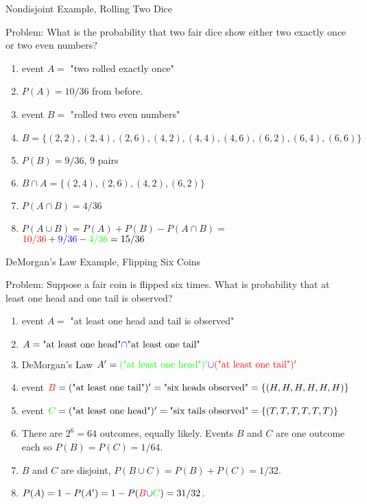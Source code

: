 \documentclass{beamer}
\newcommand{\blue}[1]{{\color{blue} #1}}
\newcommand{\red}[1]{{\color{red} #1}}
\newcommand{\grn}[1]{{\color{green} #1}}
\begin{document}
    \begin{frame}{Nondisjoint Example, Rolling Two Dice}
        
        Problem: What is the probability that two fair dice show either two exactly once or two even numbers?\\
        \begin{enumerate}
            \item event $A =$ "two rolled exactly once"
            \item \red{$P(A) = 10/36$} from before.
            \item event $B = $ "rolled two even numbers"
            \item $B = \{ (2,2), (2,4), (2,6), (4,2), (4,4), (4,6), (6,2),(6,4), (6,6) \}$
            \item \blue{$P(B) = 9/36$}, 9 pairs
            \item $B\cap A = \{ (2,4), (2,6), (4,2), (6,2) \}$
            \item \grn{$P(A \cap B) = 4/36$}
            \item $P(A \cup B) = P(A) + P(B) - P(A \cap B) =$  $\red{10/36} + \blue{9/36} - \grn{4/36} =  15/36$
        \end{enumerate}
    \end{frame}

    \begin{frame}{DeMorgan's Law Example, Flipping Six Coins}
        
        Problem: Suppose a fair coin is flipped six times. What is probability that  at least one head and one tail is observed?\\
        \begin{enumerate}
            \item event $A =$ "at least one head \blue{and} tail is observed"
            \item $A= \text{"at least one head"} \blue{\cap} \text{"at least one tail"}$ 
            \item DeMorgan's Law $A' =\grn{(\text{"at least one head"})'} \blue{\cup} \red{(\text{"at least one tail"})'}$
            \item event $\red{B} = (\text{"at least one tail"})' = \text{"six heads observed"} = \{ (H,H,H,H,H,H) \}$
            \item event $\grn{C} = (\text{"at least one head"})' = \text{"six tails observed"} = \{ (T,T,T,T,T,T) \}$
            \item There are $2^6=64$ outcomes, equally likely. Events $B$ and $C$ are one outcome each so $P(B)=P(C) = 1/64$.
            \item $B$ and $C$ are disjoint, $P(B\cup C) = P(B) + P(C) = 1/32$.
            \item $P(A) = 1 - P(A') = 1 - P(\red{B} \blue{\cup} \grn{C}) =31/32$.
        \end{enumerate}
    \end{frame}
\end{document}
